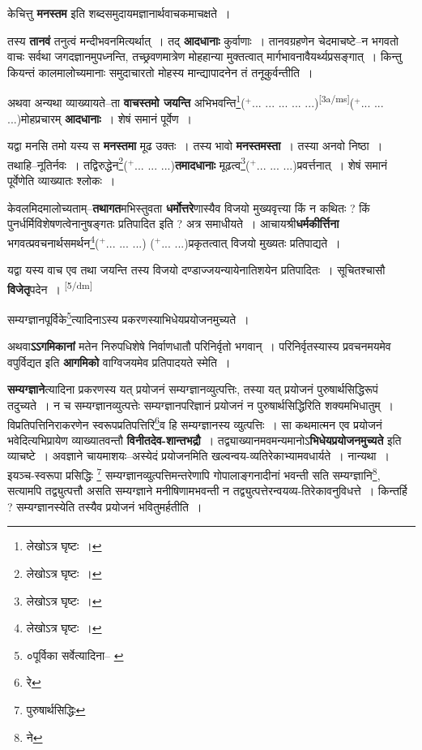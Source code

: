 \documentclass[article,12pt,a4paper]{memoir}
\newcommand{\add}[1]{($^{+}$#1)}
\begin{document}
	  \pstart केचित्तु \textbf{मनस्तम} इति शब्दसमुदायमज्ञानार्थवाचकमाचक्षते ।
	\pend
      

	  \pstart तस्य \textbf{तानवं} तनुत्वं मन्दीभवनमित्यर्थात् । तद् \textbf{आदधानाः} कुर्वाणाः । तानवग्रहणेन चेदमाचष्टे--न भगवतो वाचः सर्वथा जगदज्ञानमुपध्नन्ति, तच्छ्रवणमात्रेण मोहहान्या मुक्तत्वात् मार्गभावनावैयर्थ्यप्रसङ्गात् । किन्तु कियन्तं कालमालोच्यमानाः समुदाचारतो मोहस्य मान्द्यापादनेन तं तनूकुर्वन्तीति ।
	\pend
      

	  \pstart अथवा अन्यथा व्याख्यायते--ता \textbf{वाचस्तमो जयन्ति} अभिभवन्ति\footnote{लेखोऽत्र घृष्टः ।}\add{... ... ... ... ...}\leavevmode\textsuperscript{\rmlatinfont\tiny [3a/ms]}\add{... ... ...}मोहप्रचारम् \textbf{आदधानाः} । शेषं समानं पूर्वेण ।
	\pend
      

	  \pstart यद्वा मनसि तमो यस्य स \textbf{मनस्तमा} मूढ उक्तः । तस्य भावो \textbf{मनस्तमस्ता} । तस्या अनवो निष्ठा । तथाहि--नूतिर्नवः । तद्विरुद्धेन\footnote{लेखोऽत्र घृष्टः ।}\add{... ... ...}\textbf{तमादधानाः} मूढत्व\footnote{लेखोऽत्र घृष्टः ।}\add{... ... ...}प्रवर्त्तनात् । शेषं समानं पूर्वेणेति व्याख्यातः श्लोकः ।
	\pend
      

	  \pstart केवलमिदमालोच्यताम्--\textbf{तथागत}मभिस्तुवता \textbf{धर्मोत्तरे}णास्यैव विजयो मुख्यवृत्त्या किं न कथितः ? किं पुनर्धर्मिविशेषणत्वेनानुषङ्गतः प्रतिपादित इति ? अत्र समाधीयते । आचायश्री\textbf{धर्मकीर्त्तिना} भगवत्प्रवचनार्थसमर्थन\footnote{लेखोऽत्र घृष्टः ।}\add{... ... ...} \add{... ...}प्रकृतत्वात् विजयो मुख्यतः प्रतिपाद्यते ।
	\pend
      

	  \pstart यद्वा यस्य वाच एव तथा जयन्ति तस्य विजयो दण्डाज्जयन्यायेनातिशयेन प्रतिपादितः । सूचितश्चासौ \textbf{विजेतृ}पदेन ।
	\pend
      \leavevmode\textsuperscript{\rmlatinfont\tiny [5/dm]}

	  \pstart सम्यग्ज्ञानपूर्विके\footnote{०पूर्विका सर्वेत्यादिना--\cite{dp-msA} \cite{dp-edP} \cite{dp-edE}}त्यादिनाऽस्य प्रकरणस्याभिधेयप्रयोजनमुच्यते ।
	\pend
      

	  \pstart अथवा\textbf{ऽऽगमिकानां} मतेन निरुपधिशेषे निर्वाणधातौ परिनिर्वृतो भगवान् । परिनिर्वृतस्यास्य प्रवचनमयमेव वपुर्विद्यत इति \textbf{आगमिको} वाग्विजयमेव प्रतिपादयते स्मेति ।
	\pend
      

	  \pstart \textbf{सम्यग्ज्ञाने}त्यादिना प्रकरणस्य यत् प्रयोजनं सम्यग्ज्ञानव्युत्पत्तिः, तस्या यत् प्रयोजनं पुरुषार्थसिद्धिरूपं तदुच्यते । न च सम्यग्ज्ञानव्युत्पत्तेः सम्यग्ज्ञानपरिज्ञानं प्रयोजनं न पुरुषार्थसिद्धिरिति शक्यमभिधातुम् । विप्रतिपत्तिनिराकरणेन स्वरूपप्रतिपत्तिरि\footnote{रे}व हि सम्यग्ज्ञानस्य व्युत्पत्तिः । सा कथमात्मन एव प्रयोजनं भवेदित्यभिप्रायेण व्याख्यातवन्तौ \textbf{विनीतदेव-शान्तभद्रौ} । तद्व्याख्यानमवमन्यमानोऽ\textbf{भिधेयप्रयोजनमुच्यते} इति व्याचष्टे । अवज्ञाने चायमाशयः--अस्येदं प्रयोजनमिति खल्वन्वय-व्यतिरेकाभ्यामवधार्यते । नान्यथा । इयञ्च-स्वरूपा प्रसिद्धिः \footnote{पुरुषार्थसिद्धिः} सम्यग्ज्ञानव्युत्पत्तिमन्तरेणापि गोपालाङ्गनादीनां भवन्ती सति सम्यग्ज्ञानि\footnote{ने}, सत्यामपि तद्व्युत्पत्तौ असति सम्यग्ज्ञाने मनीषिणामभवन्ती न तद्व्युत्पत्तेरन्वयव्य-तिरेकावनुविधत्ते । किन्तर्हि ? सम्यग्ज्ञानस्येति तस्यैव प्रयोजनं भवितुमर्हतीति ।
	\pend
      
\end{document}
